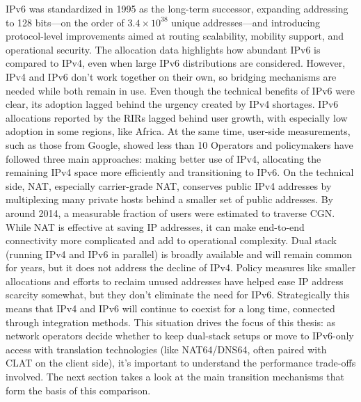 IPv6 was standardized in 1995 as the long-term successor, expanding addressing to 128 bits—on the order of $3.4 \times 10^{38}$ unique addresses—and introducing protocol-level improvements aimed at routing scalability, mobility support, and operational security\cite{rfc1883,7737362,LEVIN20141059}. The allocation data highlights how abundant IPv6 is compared to IPv4, even when large IPv6 distributions are considered\cite{7737362}. However, IPv4 and IPv6 don't work together on their own, so bridging mechanisms are needed while both remain in use\cite{LEVIN20141059}.
Even though the technical benefits of IPv6 were clear, its adoption lagged behind the urgency created by IPv4 shortages. IPv6 allocations reported by the RIRs lagged behind user growth, with especially low adoption in some regions, like Africa. At the same time, user-side measurements, such as those from Google, showed less than 10%
Operators and policymakers have followed three main approaches: making better use of IPv4, allocating the remaining IPv4 space more efficiently and transitioning to IPv6\cite{LEVIN20141059}. On the technical side, NAT, especially carrier-grade NAT, conserves public IPv4 addresses by multiplexing many private hosts behind a smaller set of public addresses\cite{rfc2663}. By around 2014, a measurable fraction of users were estimated to traverse CGN\cite{livadariu2018inferring}. While NAT is effective at saving IP addresses, it can make end-to-end connectivity more complicated and add to operational complexity\cite{rfc2993}. Dual stack (running IPv4 and IPv6 in parallel) is broadly available and will remain common for years, but it does not address the decline of IPv4\cite{LEVIN20141059}. Policy measures like smaller allocations and efforts to reclaim unused addresses have helped ease IP address scarcity somewhat, but they don't eliminate the need for IPv6\cite{LEVIN20141059}.
Strategically this means that IPv4 and IPv6 will continue to coexist for a long time, connected through integration methods\cite{7737362,LEVIN20141059}. This situation drives the focus of this thesis: as network operators decide whether to keep dual-stack setups or move to IPv6-only access with translation technologies (like NAT64/DNS64, often paired with CLAT on the client side), it's important to understand the performance trade-offs involved. The next section takes a look at the main transition mechanisms that form the basis of this comparison\cite{7737362,LEVIN20141059}.


